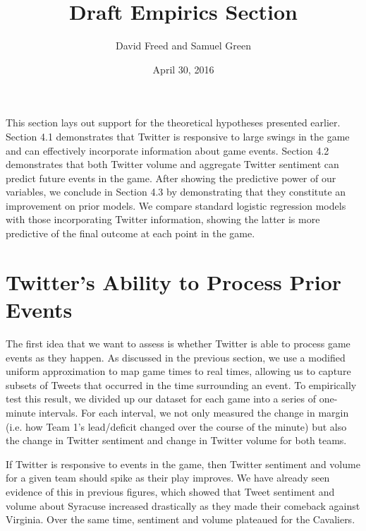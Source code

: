 \documentclass[12pt]{article}
\begin{document}
\setcounter{page}{1}
\begin{doublespacing}

\title{Draft Empirics Section}
\author{David Freed and Samuel Green}
\date{April 30, 2016}
\maketitle

This section lays out support for the theoretical hypotheses presented earlier. Section 4.1 demonstrates that Twitter is responsive to large swings in the game and can effectively incorporate information about game events. Section 4.2 demonstrates that both Twitter volume and aggregate Twitter sentiment can predict future events in the game. After showing the predictive power of our variables, we conclude in Section 4.3 by demonstrating that they constitute an improvement on prior models. We compare standard logistic regression models with those incorporating Twitter information, showing the latter is more predictive of the final outcome at each point in the game. 

\section*{Twitter's Ability to Process Prior Events}

The first idea that we want to assess is whether Twitter is able to process game events as they happen. As discussed in the previous section, we use a modified uniform approximation to map game times to real times, allowing us to capture subsets of Tweets that occurred in the time surrounding an event. To empirically test this result, we divided up our dataset for each game into a series of one-minute intervals. For each interval, we not only measured the change in margin (i.e. how Team 1's lead/deficit changed over the course of the minute) but also the change in Twitter sentiment and change in Twitter volume for both teams. 

If Twitter is responsive to events in the game, then Twitter sentiment and volume for a given team should spike as their play improves. We have already seen evidence of this in previous figures, which showed that Tweet sentiment and volume about Syracuse increased drastically as they made their comeback against Virginia. Over the same time, sentiment and volume plateaued for the Cavaliers. 


\end{doublespacing}
\end{document}
